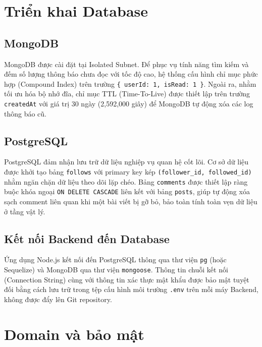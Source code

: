 \documentclass[12pt, a4paper]{article}
\begin{document}

\section{Triển khai Database}

\subsection{MongoDB}
MongoDB được cài đặt tại Isolated Subnet. Để phục vụ tính năng tìm kiếm và đếm số lượng thông báo chưa đọc với tốc độ cao, hệ thống cấu hình chỉ mục phức hợp (Compound Index) trên trường \texttt{\{ userId: 1, isRead: 1 \}}. Ngoài ra, nhằm tối ưu hóa bộ nhớ đĩa, chỉ mục TTL (Time-To-Live) được thiết lập trên trường \texttt{createdAt} với giá trị 30 ngày (2,592,000 giây) để MongoDB tự động xóa các log thông báo cũ.

\subsection{PostgreSQL}
PostgreSQL đảm nhận lưu trữ dữ liệu nghiệp vụ quan hệ cốt lõi. Cơ sở dữ liệu được khởi tạo bảng \texttt{follows} với primary key kép \texttt{(follower\_id, followed\_id)} nhằm ngăn chặn dữ liệu theo dõi lặp chéo. Bảng \texttt{comments} được thiết lập ràng buộc khóa ngoại \texttt{ON DELETE CASCADE} liên kết với bảng \texttt{posts}, giúp tự động xóa sạch comment liên quan khi một bài viết bị gỡ bỏ, bảo toàn tính toàn vẹn dữ liệu ở tầng vật lý.

\subsection{Kết nối Backend đến Database}
Ứng dụng Node.js kết nối đến PostgreSQL thông qua thư viện \texttt{pg} (hoặc Sequelize) và MongoDB qua thư viện \texttt{mongoose}. Thông tin chuỗi kết nối (Connection String) cùng với thông tin xác thực mật khẩu được bảo mật tuyệt đối bằng cách lưu trữ trong tệp cấu hình môi trường \texttt{.env} trên mỗi máy Backend, không được đẩy lên Git repository.



\section{Domain và bảo mật}
\end{document}
